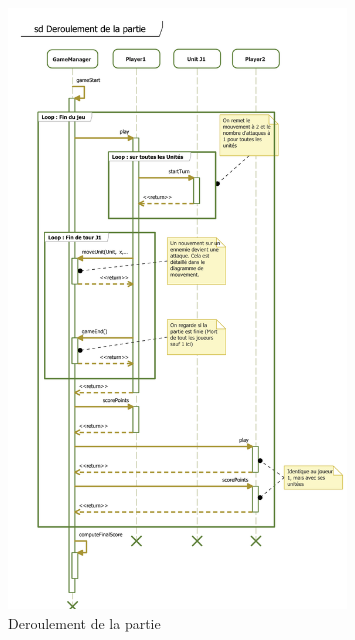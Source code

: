\begin{figure}[h!]
    \centering
    \includegraphics[width=0.8\textwidth]{res/DeroulementPartie.png}
    \caption{Deroulement de la partie}
    \label{fig:gameFlow}
\end{figure}

